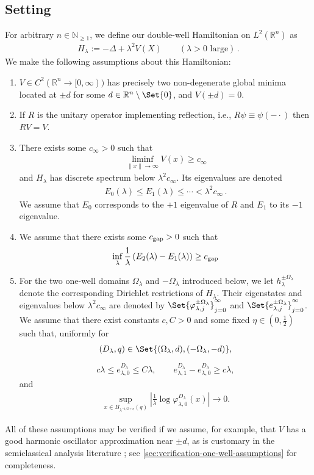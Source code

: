 \documentclass[a4paper,10pt]{article}
\numberwithin{equation}{section}
\theoremstyle{plain}
\theoremstyle{plain}
\theoremstyle{plain}
\theoremstyle{plain}
\theoremstyle{plain}
\theoremstyle{remark}
\theoremstyle{definition}
\newcommand{\NN}{\mathbb{N}}
\newcommand{\RR}{\mathbb{R}}
\newcommand\norm[1]{\left\lVert#1\right\rVert}
\newcommand{\vf}{\varphi}
\newcommand{\eq}[1]{\begin{align*}#1\end{align*}}
\newcommand{\eql}[1]{\begin{align}#1\end{align}}
\newcommand{\br}[1]{\left(#1\right)}
\begin{document}
\subsection{Setting}
For arbitrary $n\in\NN_{\geq1}$, we define our double-well Hamiltonian on $L^2(\RR^n)$ as \eql{
H_\lambda := -\Delta + \lambda^2 V(X)\qquad(\lambda >0 \text{ large})\,.
} We make the following assumptions about this Hamiltonian:
\begin{enumerate}
    \item $V\in C^2(\RR^n\to[0,\infty))$ has precisely two non-degenerate global minima located at $\pm d$ for some $d\in\RR^n\setminus\Set{0}$, and $V(\pm d)=0$.
    \item If $R$ is the unitary operator implementing reflection, i.e., $R \psi\equiv\psi(-\cdot)$ then $RV = V$.
    \item There exists some $c_\infty>0$ such that \eql{
\liminf_{\norm{x}\to\infty}V\left(x\right)\geq c_{\infty}
    } and $H_\lambda$ has discrete spectrum below $\lambda^2 c_\infty$. Its eigenvalues are denoted \eql{
    E_0(\lambda)\leq E_1(\lambda) \leq \cdots<\lambda^2c_\infty\,.
    } We assume that $E_0$ corresponds to the $+1$ eigenvalue of $R$ and $E_1$ to its $-1$ eigenvalue.

    \item We assume that there exists some $c_{\rm gap}>0$ such that \eql{
    \inf_\lambda \frac{1}{\lambda}\br{E_2(\lambda)-E_1(\lambda) }\geq c_{\rm gap} 
    }
    \item For the two one-well domains $\Omega_\lambda$ and
    $-\Omega_\lambda$ introduced below, we let $h_\lambda^{\pm
    \Omega_\lambda}$ denote the corresponding Dirichlet restrictions of
    $H_\lambda$. Their eigenstates and eigenvalues below
    $\lambda^2c_\infty$ are denoted by
    $\Set{\vf_{\lambda,j}^{\pm\Omega_\lambda}}_{j=0}^\infty$ and
    $\Set{e_{\lambda,j}^{\pm\Omega_\lambda}}_{j=0}^\infty$. We assume that
    there exist constants $c,C>0$ and some fixed
    $\eta\in(0,\frac12)$ such that, uniformly for
    \eq{
    (D_\lambda,q)
    \in
    \Set{
    (\Omega_\lambda,d),
    (-\Omega_\lambda,-d)
    },
    }
    \eq{
    c\lambda\leq e_{\lambda,0}^{D_\lambda}\leq C\lambda,
    \qquad
    e_{\lambda,1}^{D_\lambda}-e_{\lambda,0}^{D_\lambda}
    \geq c\lambda,
    }
    and
    \eq{
    \sup_{x\in B_{\lambda^{-1/2+\eta}}(q)}
    \left|
    \frac1\lambda\log\vf_{\lambda,0}^{D_\lambda}(x)
    \right|
    \longrightarrow0.
    }
\end{enumerate}

All of these assumptions may be verified if we assume, for example, that $V$ has a good harmonic oscillator approximation near $\pm d$, as is customary in the semiclassical analysis literature \cite{Simon_1984_10.2307/2007072,Helffer_Sjostrand_1984}; see \cref{sec:verification-one-well-assumptions} for completeness.
\end{document}
